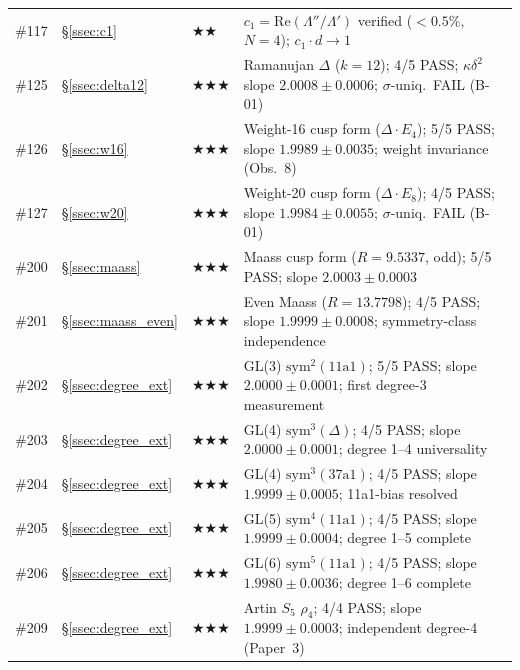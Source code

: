 \documentclass[11pt, a4paper]{article}
\theoremstyle{plain}
\theoremstyle{definition}
\begin{document}
\begin{longtable}{lllp{5.5cm}}
\#117 & \S\ref{ssec:c1}           & \textbf{$\bigstar\bigstar$}     & $c_{1}=\mathrm{Re}(\Lambda''/\Lambda')$ verified ($<0.5\%$, $N=4$); $c_{1}\cdot d\to 1$ \\
\#125 & \S\ref{ssec:delta12}      & \textbf{$\bigstar\bigstar\bigstar$}    & Ramanujan $\Delta$ ($k=12$); 4/5 PASS; $\kappa\delta^{2}$ slope $2.0008\pm0.0006$; $\sigma$-uniq.\ FAIL (B-01) \\
\#126 & \S\ref{ssec:w16}          & \textbf{$\bigstar\bigstar\bigstar$}    & Weight-16 cusp form ($\Delta\cdot E_4$); 5/5 PASS; slope $1.9989\pm0.0035$; weight invariance (Obs.~8) \\
\#127 & \S\ref{ssec:w20}          & \textbf{$\bigstar\bigstar\bigstar$}    & Weight-20 cusp form ($\Delta\cdot E_8$); 4/5 PASS; slope $1.9984\pm0.0055$; $\sigma$-uniq.\ FAIL (B-01) \\
\#200 & \S\ref{ssec:maass}        & \textbf{$\bigstar\bigstar\bigstar$}    & Maass cusp form ($R{=}9.5337$, odd); 5/5 PASS; slope $\mathbf{2.0003\pm0.0003}$ \\
\#201 & \S\ref{ssec:maass_even}   & \textbf{$\bigstar\bigstar\bigstar$}    & Even Maass ($R{=}13.7798$); 4/5 PASS; slope $1.9999\pm0.0008$; symmetry-class independence \\
\#202 & \S\ref{ssec:degree_ext}   & \textbf{$\bigstar\bigstar\bigstar$}    & GL(3) $\mathrm{sym}^{2}(\text{11a1})$; 5/5 PASS; slope $\mathbf{2.0000\pm0.0001}$; first degree-3 measurement \\
\#203 & \S\ref{ssec:degree_ext}   & \textbf{$\bigstar\bigstar\bigstar$}    & GL(4) $\mathrm{sym}^{3}(\Delta)$; 4/5 PASS; slope $\mathbf{2.0000\pm0.0001}$; degree 1--4 universality \\
\#204 & \S\ref{ssec:degree_ext}   & \textbf{$\bigstar\bigstar\bigstar$}    & GL(4) $\mathrm{sym}^{3}(\text{37a1})$; 4/5 PASS; slope $\mathbf{1.9999\pm0.0005}$; 11a1-bias resolved \\
\#205 & \S\ref{ssec:degree_ext}   & \textbf{$\bigstar\bigstar\bigstar$}    & GL(5) $\mathrm{sym}^{4}(\text{11a1})$; 4/5 PASS; slope $\mathbf{1.9999\pm0.0004}$; degree 1--5 complete \\
\#206 & \S\ref{ssec:degree_ext}   & \textbf{$\bigstar\bigstar\bigstar$}    & GL(6) $\mathrm{sym}^{5}(\text{11a1})$; 4/5 PASS; slope $\mathbf{1.9980\pm0.0036}$; degree 1--6 complete \\
\#209 & \S\ref{ssec:degree_ext}   & \textbf{$\bigstar\bigstar\bigstar$}    & Artin $S_5$ $\rho_4$; 4/4 PASS; slope $\mathbf{1.9999\pm0.0003}$; independent degree-4 (Paper~3) \\

\end{longtable}
\end{document}
